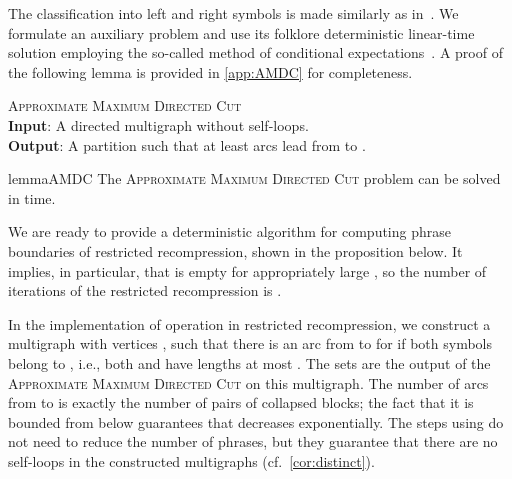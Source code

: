 \documentclass[a4paper]{article}
\theoremstyle{definition}
\theoremstyle{remark}
\newenvironment{dsproblem}[1]
{\begin{center}\begin{lrbox}{\mybox}\begin{minipage}{0.96\columnwidth}{\textsc{#1}}\\}
{\end{minipage}\end{lrbox}\fbox{\usebox{\mybox}}\end{center}}
\newcommand{\defdsproblem}[2]{
  \begin{dsproblem}{#1}
#2
  \end{dsproblem}
  }
\begin{document}
The classification into left and right symbols is made similarly as in~\cite[Lemma 6.2]{DBLP:journals/talg/Jez15}.
We formulate an auxiliary problem and use its folklore deterministic linear-time solution employing the so-called method of conditional expectations~\cite[Section 6.3]{MU05}.
A proof of the following lemma is provided in \cref{app:AMDC} for completeness.

\defdsproblem{\textsc{Approximate Maximum Directed Cut}}{
\textbf{Input}: A directed multigraph  without self-loops.\\
\textbf{Output}:
A partition  such that at least  arcs lead from  to .
}

\begin{restatable}{lemma}{AMDC}
\label{lem:maxcut}
The \textsc{Approximate Maximum Directed Cut} problem can be solved in  time.
\end{restatable}

We are ready to provide a deterministic algorithm for computing phrase boundaries of restricted recompression, shown in the proposition below.
It implies, in particular, that  is empty for appropriately large , so the number of iterations 
of the restricted recompression is .

In the implementation of operation  in restricted recompression, we construct a multigraph with vertices
, such that there is an arc from  to  for  if both symbols belong to , i.e., both  and  have lengths at most .
The sets  are the output  of the \textsc{Approximate Maximum Directed Cut} on this multigraph.
The number of arcs from  to  is exactly the number of pairs of collapsed blocks; the fact that it is bounded from below
guarantees that  decreases exponentially.
The steps using  do not need to reduce the number of phrases, but they guarantee that there are no self-loops in the constructed multigraphs
(cf.\ \cref{cor:distinct}).
\end{document}
